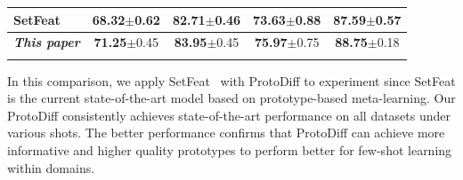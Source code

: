 \begin{table}
{\begin{tabular}{lcccc}
SetFeat~\cite{afrasiyabi2022matching} & 68.32\textcolor{mygray}{\scriptsize{$\pm$0.62}} & 82.71\textcolor{mygray}{\scriptsize{$\pm$0.46}} & {73.63}\textcolor{mygray}{\scriptsize{$\pm$0.88}} & {87.59}\textcolor{mygray}{\scriptsize{$\pm$0.57}} \\
\midrule
\rowcolor{softblue}
{\textbf{\textit{This paper}}} & \textbf{71.25}\textcolor{mygray}{\scriptsize{$\pm$0.45}} & \textbf{83.95}\textcolor{mygray}{\scriptsize{$\pm$0.45}} & \textbf{75.97}\textcolor{mygray}{\scriptsize{$\pm$0.75}} &  \textbf{88.75}\textcolor{mygray}{\scriptsize{$\pm$0.18}}
\\

\bottomrule
\vspace{-3mm}
\end{tabular}}
\label{tab:main}
\end{table}
In this comparison, we apply SetFeat~\cite{afrasiyabi2022matching} with ProtoDiff to experiment since SetFeat is the current state-of-the-art model based on prototype-based meta-learning. Our ProtoDiff consistently achieves state-of-the-art performance on all datasets under various shots.
The better performance confirms that ProtoDiff can achieve more informative and higher quality prototypes to perform better for few-shot learning within domains.


 

